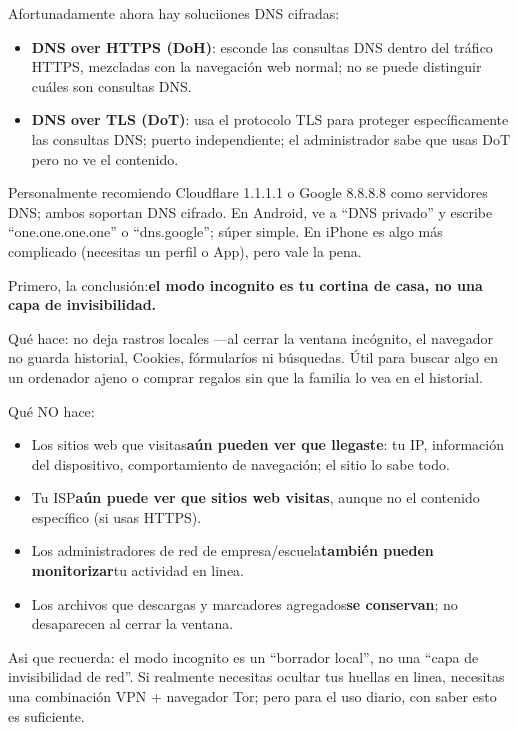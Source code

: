 Afortunadamente ahora hay soluciiones DNS cifradas:

\begin{itemize}
  \item \textbf{DNS over HTTPS (DoH)}: esconde las consultas DNS dentro del tráfico HTTPS, mezcladas con la navegación web normal; no se puede distinguir cuáles son consultas DNS.
  \item \textbf{DNS over TLS (DoT)}: usa el protocolo TLS para proteger específicamente las consultas DNS; puerto independiente; el administrador sabe que usas DoT pero no ve el contenido.
\end{itemize}

Personalmente recomiendo Cloudflare 1.1.1.1 o Google 8.8.8.8 como servidores DNS; ambos soportan DNS cifrado. En Android, ve a “DNS privado” y escribe “one.one.one.one” o “dns.google”; súper simple. En iPhone es algo más complicado (necesitas un perfil o App), pero vale la pena.


Primero, la conclusión:\textbf{el modo incognito es tu cortina de casa, no una capa de invisibilidad.}

Qué hace: no deja rastros locales —al cerrar la ventana incógnito, el navegador no guarda historial, Cookies, fórmularíos ni búsquedas. Útil para buscar algo en un ordenador ajeno o comprar regalos sin que la familia lo vea en el historial.

Qué NO hace:

\begin{itemize}
  \item Los sitios web que visitas\textbf{aún pueden ver que llegaste}: tu IP, información del dispositivo, comportamiento de navegación; el sitio lo sabe todo.
  \item Tu ISP\textbf{aún puede ver que sitios web visitas}, aunque no el contenido específico (si usas HTTPS).
  \item Los administradores de red de empresa/escuela\textbf{también pueden monitorizar}tu actividad en linea.
  \item Los archivos que descargas y marcadores agregados\textbf{se conservan}; no desaparecen al cerrar la ventana.
\end{itemize}

Asi que recuerda: el modo incognito es un “borrador local”, no una “capa de invisibilidad de red”. Si realmente necesitas ocultar tus huellas en linea, necesitas una combinación VPN + navegador Tor; pero para el uso diario, con saber esto es suficiente.

